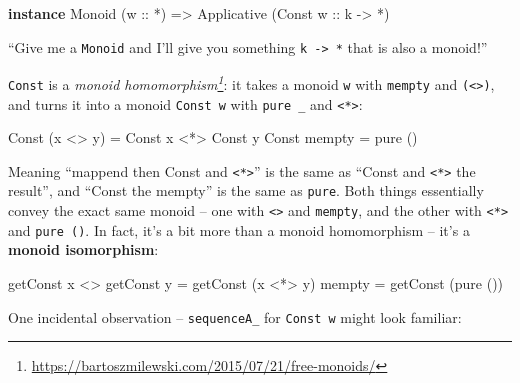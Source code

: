 \documentclass[]{article}
\newenvironment{Shaded}{}{}
\newcommand{\DataTypeTok}[1]{\textcolor[rgb]{0.56,0.13,0.00}{#1}}
\newcommand{\FunctionTok}[1]{\textcolor[rgb]{0.02,0.16,0.49}{#1}}
\newcommand{\KeywordTok}[1]{\textcolor[rgb]{0.00,0.44,0.13}{\textbf{#1}}}
\newcommand{\NormalTok}[1]{#1}
\newcommand{\OtherTok}[1]{\textcolor[rgb]{0.00,0.44,0.13}{#1}}
\renewcommand{\href}[2]{#2\footnote{\url{#1}}}
\begin{document}
\begin{Shaded}
\begin{Highlighting}[]
\KeywordTok{instance} \DataTypeTok{Monoid}\NormalTok{ (}\OtherTok{w ::} \FunctionTok{*}\NormalTok{) }\OtherTok{=>} \DataTypeTok{Applicative}\NormalTok{ (}\DataTypeTok{Const}\OtherTok{ w ::}\NormalTok{ k }\OtherTok{->} \FunctionTok{*}\NormalTok{)}
\end{Highlighting}
\end{Shaded}

``Give me a \texttt{Monoid} and I'll give you something
\texttt{k\ -\textgreater{}\ *} that is also a monoid!''

\texttt{Const} is a
\emph{\href{https://bartoszmilewski.com/2015/07/21/free-monoids/}{monoid
homomorphism}}: it takes a monoid \texttt{w} with \texttt{mempty} and
\texttt{(\textless{}\textgreater{})}, and turns it into a monoid
\texttt{Const\ w} with \texttt{pure\ \_} and
\texttt{\textless{}*\textgreater{}}:

\begin{Shaded}
\begin{Highlighting}[]
\DataTypeTok{Const}\NormalTok{ (x }\FunctionTok{<>}\NormalTok{ y) }\FunctionTok{=} \DataTypeTok{Const}\NormalTok{ x }\FunctionTok{<*>} \DataTypeTok{Const}\NormalTok{ y}
\DataTypeTok{Const}\NormalTok{ mempty   }\FunctionTok{=}\NormalTok{ pure ()}
\end{Highlighting}
\end{Shaded}

Meaning ``mappend then Const and \texttt{\textless{}*\textgreater{}}'' is the
same as ``Const and \texttt{\textless{}*\textgreater{}} the result'', and
``Const the mempty'' is the same as \texttt{pure}. Both things essentially
convey the exact same monoid -- one with \texttt{\textless{}\textgreater{}} and
\texttt{mempty}, and the other with \texttt{\textless{}*\textgreater{}} and
\texttt{pure\ ()}. In fact, it's a bit more than a monoid homomorphism -- it's a
\textbf{monoid isomorphism}:

\begin{Shaded}
\begin{Highlighting}[]
\NormalTok{getConst x }\FunctionTok{<>}\NormalTok{ getConst y }\FunctionTok{=}\NormalTok{ getConst (x }\FunctionTok{<*>}\NormalTok{ y)}
\NormalTok{mempty                   }\FunctionTok{=}\NormalTok{ getConst (pure ())}
\end{Highlighting}
\end{Shaded}

One incidental observation -- \texttt{sequenceA\_} for \texttt{Const\ w} might
look familiar:
\end{document}
